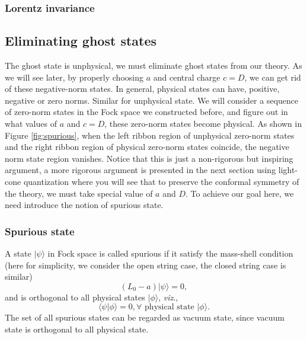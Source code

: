 \documentclass[graybox,envcountchap,sectrefs]{svmono}
\begin{document}
\subsubsection*{Lorentz invariance}



\subsection{Eliminating ghost states}
The ghost state is  unphysical, we must eliminate ghost states from our theory.
As we will see later, by properly choosing $a$ and central charge $c=D$, we can get rid of these negative-norm states.
In general, physical states can have, positive, negative or zero norms. Similar for unphysical state. We will consider a sequence of zero-norm states in the Fock space we constructed before, and figure out in what values of $a$ and $c=D$, these zero-norm states become physical. As shown in Figure \ref{fig:spurious}, when the left ribbon region of unphysical zero-norm states and the right ribbon region of physical zero-norm states coincide, the negative norm state region vanishes. Notice that this is just a non-rigorous but inspiring argument, a more rigorous argument is presented in the next section using light-cone quantization where you will see that to preserve the conformal symmetry of the theory, we must take special value of $a$ and $D$. To achieve our goal here, we need introduce the notion of spurious state.

\subsubsection*{Spurious state}


A state $|\psi\rangle$ in Fock space is called spurious if 
it satisfy the mass-shell condition (here for simplicity, we consider the open string case, the closed string case is similar)
\begin{equation}
\left({L}_{0}-a\right)|\psi\rangle=0	,
\end{equation}
and is orthogonal to all physical states $|\phi\rangle$, \emph{viz}., 
\begin{equation}
\langle \psi|\phi\rangle=0, \forall \,\,\text{physical state}\,\, |\phi\rangle.
\end{equation}
The set of all spurious states can be regarded as vacuum state, since vacuum state is orthogonal to all physical state.
\end{document}
